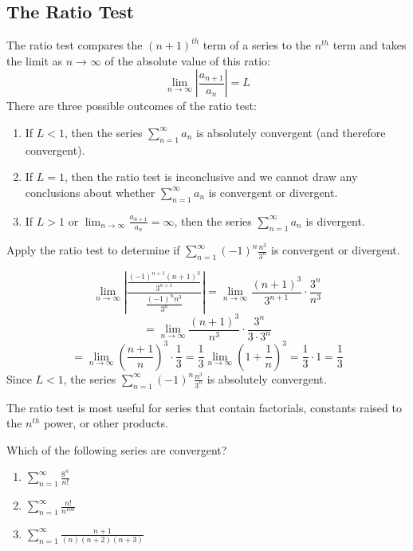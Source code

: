 \subsection{The Ratio Test}
The ratio test compares the $(n + 1)^{th}$ term of a series 
to the $n^{th}$ term and takes the limit as $n \to \infty$ of the absolute 
value of this ratio:
$$\lim_{n \to \infty} \left| \frac{a_{n + 1}}{a_n} \right| = L$$
There are three possible outcomes of the ratio test:
\begin{enumerate}
\item If $L < 1$, then the series $\sum_{n=1}^\infty a_n$ is absolutely 
convergent (and therefore convergent).
\item If $L = 1$, then the ratio test is inconclusive and we cannot draw any 
conclusions about whether $\sum_{n=1}^\infty a_n$ is convergent or divergent.
\item If $L > 1$ or $\lim_{n \to \infty} \frac{a_{n + 1}}{a_n} = \infty$, then 
the series $\sum_{n=1}^\infty a_n$ is divergent.
\end{enumerate}

\begin{Worked}
\begin{Problem}
Apply the ratio test to determine if $\sum_{n=1}^\infty 
(-1)^n \frac{n^3}{3^n}$ is convergent or divergent. 
\end{Problem}
\begin{Solution}
$$\lim_{n \to \infty} \left| \frac{\frac{(-1)^{n + 1}(n + 1)^3}{3^{n + 1}}}{
\frac{(-1)^n n^3}{3^n}} \right| = \lim_{n \to \infty} \frac{(n + 1)^3}{3^{n + 
1}} \cdot \frac{3^n}{n^3}$$
$$= \lim_{n \to \infty} \frac{(n + 1)^3}{n^3} \cdot \frac{3^n}{3 \cdot 3^n}$$
$$= \lim_{n \to \infty} \left( \frac{n + 1}{n} \right)^3 \cdot \frac{1}{3} = 
\frac{1}{3} \lim_{n \to \infty} \left( 1 + \frac{1}{n} \right)^3 = \frac{1}{3} 
\cdot 1 = \frac{1}{3} $$
Since $L < 1$, the series $\sum_{n=1}^\infty (-1)^n \frac{n^3}{3^n}$ is 
absolutely convergent. 
\end{Solution}
\end{Worked}

The ratio test is most useful for series that contain factorials, constants 
raised to the $n^{th}$ power, or other products. 

\begin{Exercise} Which of the following series are 
convergent?
\begin{enumerate}
\item $\sum_{n=1}^\infty \frac{8^n}{n!}$
\item $\sum_{n=1}^\infty \frac{n!}{n^{100}}$
\item $\sum_{n=1}^\infty \frac{n + 1}{(n)(n+2)(n+3)}$
\end{enumerate}
\end{Exercise}

